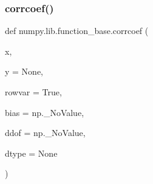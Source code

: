 \subsubsection{\texorpdfstring{corrcoef()}{corrcoef()}}
{\footnotesize\ttfamily def numpy.\+lib.\+function\+\_\+base.\+corrcoef (\begin{DoxyParamCaption}\item[{}]{x,  }\item[{}]{y = {\ttfamily None},  }\item[{}]{rowvar = {\ttfamily True},  }\item[{}]{bias = {\ttfamily np.\+\_\+NoValue},  }\item[{}]{ddof = {\ttfamily np.\+\_\+NoValue},  }\item[{}]{dtype = {\ttfamily None} }\end{DoxyParamCaption})}

